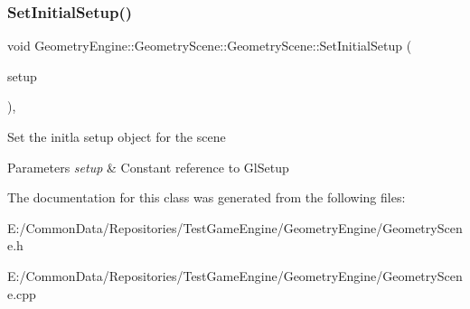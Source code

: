 \subsubsection{\texorpdfstring{SetInitialSetup()}{SetInitialSetup()}}
{\footnotesize\ttfamily void Geometry\+Engine\+::\+Geometry\+Scene\+::\+Geometry\+Scene\+::\+Set\+Initial\+Setup (\begin{DoxyParamCaption}\item[{const \mbox{\hyperlink{class_geometry_engine_1_1_geometry_gl_setup_1_1_gl_setup}{Geometry\+Gl\+Setup\+::\+Gl\+Setup}} \&}]{setup }\end{DoxyParamCaption})\hspace{0.3cm}{\ttfamily [inline]}, {\ttfamily [virtual]}}

Set the initla setup object for the scene 
\begin{DoxyParams}{Parameters}
{\em setup} & Constant reference to Gl\+Setup \\
\hline
\end{DoxyParams}


The documentation for this class was generated from the following files\+:\begin{DoxyCompactItemize}
\item 
E\+:/\+Common\+Data/\+Repositories/\+Test\+Game\+Engine/\+Geometry\+Engine/Geometry\+Scene.\+h\item 
E\+:/\+Common\+Data/\+Repositories/\+Test\+Game\+Engine/\+Geometry\+Engine/Geometry\+Scene.\+cpp\end{DoxyCompactItemize}
